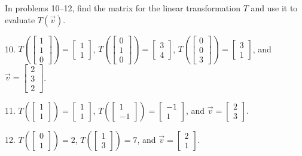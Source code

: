 \documentclass{article}
\begin{document}
In problems 10--12, find the matrix for the linear transformation $T$ and use it to evaluate $T(\vec{v})$.

10. $T\left( \left[\begin{array}{c} 1 \\ 1 \\ 0 \end{array}\right] \right) = \left[\begin{array}{c} 1 \\ 1 \end{array}\right]$, $T\left( \left[\begin{array}{c} 0 \\ 1 \\ 0 \end{array}\right] \right) = \left[\begin{array}{c} 3 \\ 4 \end{array}\right]$, $T\left( \left[\begin{array}{c} 0 \\ 0 \\ 3 \end{array}\right] \right) = \left[\begin{array}{c} 3 \\ 1 \end{array}\right]$, and $\vec{v} = \left[\begin{array}{c} 2 \\ 3 \\ 2 \end{array}\right]$.

11. $T\left( \left[\begin{array}{c} 1 \\ 1 \end{array}\right] \right) = \left[\begin{array}{c} 1 \\ 1 \end{array}\right]$, $T\left( \left[\begin{array}{c} 1 \\ -1 \end{array}\right] \right) = \left[\begin{array}{c} -1 \\ 1 \end{array}\right]$, and $\vec{v} = \left[\begin{array}{c} 2 \\ 3 \end{array}\right]$.

12. $T\left( \left[\begin{array}{c} 0 \\ 1 \end{array}\right] \right) = 2$, $T\left( \left[\begin{array}{c} 1 \\ 3 \end{array}\right] \right) = 7$, and $\vec{v} = \left[\begin{array}{c} 2 \\ 1 \end{array}\right]$.
\end{document}
